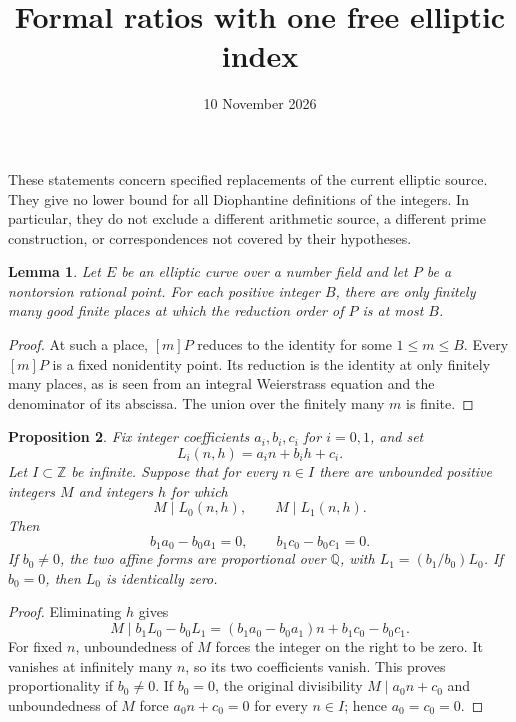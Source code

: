 \documentclass[11pt]{article}
\newtheorem{proposition}{Proposition}
\newtheorem{lemma}[proposition]{Lemma}
\newcommand{\Z}{\mathbb Z}
\newcommand{\Q}{\mathbb Q}
\begin{document}
\title{Formal ratios with one free elliptic index}
\author{}\date{10 November 2026}\maketitle

These statements concern specified replacements of the current elliptic
source. They give no lower bound for all Diophantine definitions of the
integers. In particular, they do not exclude a different arithmetic
source, a different prime construction, or correspondences not covered
by their hypotheses.

\begin{lemma}
Let $E$ be an elliptic curve over a number field and let $P$ be a
nontorsion rational point. For each positive integer $B$, there are
only finitely many good finite places at which the reduction order of
$P$ is at most $B$.
\end{lemma}
\begin{proof}
At such a place, $[m]P$ reduces to the identity for some
$1\le m\le B$. Every $[m]P$ is a fixed nonidentity point. Its
reduction is the identity at only finitely many places, as is seen
from an integral Weierstrass equation and the denominator of its
abscissa. The union over the finitely many $m$ is finite.
\end{proof}

\begin{proposition}
Fix integer coefficients $a_i,b_i,c_i$ for $i=0,1$, and set
\[
        L_i(n,h)=a_i n+b_i h+c_i.
\]
Let $I\subset\Z$ be infinite. Suppose that for every $n\in I$
there are unbounded positive integers $M$ and integers $h$ for which
\[
                  M\mid L_0(n,h),\qquad M\mid L_1(n,h).
\]
Then
\[
        b_1a_0-b_0a_1=0,
        \qquad b_1c_0-b_0c_1=0.
\]
If $b_0\ne0$, the two affine forms are proportional over $\Q$,
with $L_1=(b_1/b_0)L_0$. If $b_0=0$, then $L_0$ is identically
zero.
\end{proposition}
\begin{proof}
Eliminating $h$ gives
\[
 M\mid b_1L_0-b_0L_1
      =(b_1a_0-b_0a_1)n+b_1c_0-b_0c_1.
\]
For fixed $n$, unboundedness of $M$ forces the integer on the
right to be zero. It vanishes at infinitely many $n$, so its two
coefficients vanish. This proves proportionality if $b_0\ne0$.
If $b_0=0$, the original divisibility $M\mid a_0n+c_0$ and
unboundedness of $M$ force $a_0n+c_0=0$ for every $n\in I$;
hence $a_0=c_0=0$.
\end{proof}
\end{document}
